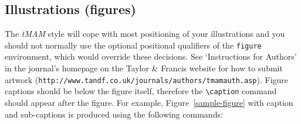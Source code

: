 \documentclass[]{tMAM2e}
\begin{document}
\subsection{Illustrations (figures)}

The {\it tMAM} style will cope with most positioning of your illustrations and you should not normally use the
optional positional qualifiers of the {\tt figure} environment, which would override these decisions. See
`Instructions for Authors' in the journal's homepage on the Taylor \& Francis website  for how to submit artwork ({\tt{http://www.tandf.co.uk/journals/authors/tmamauth.asp}}).
Figure captions should be below the figure itself, therefore the \verb"\caption" command should appear after the
figure. For example, Figure~\ref{sample-figure} with caption and sub-captions is produced using the following
commands:
%
\end{document}

